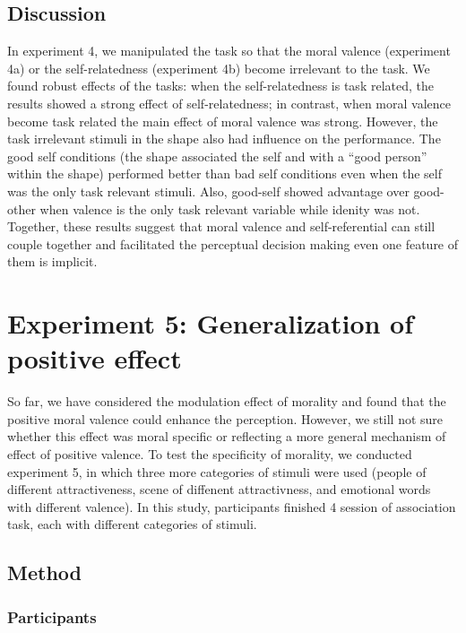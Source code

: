 \documentclass[man]{apa6}
\begin{document}
\hypertarget{discussion-4}{%
\subsection{Discussion}\label{discussion-4}}

In experiment 4, we manipulated the task so that the moral valence (experiment 4a) or the self-relatedness (experiment 4b) become irrelevant to the task. We found robust effects of the tasks: when the self-relatedness is task related, the results showed a strong effect of self-relatedness; in contrast, when moral valence become task related the main effect of moral valence was strong. However, the task irrelevant stimuli in the shape also had influence on the performance. The good self conditions (the shape associated the self and with a \enquote{good person} within the shape) performed better than bad self conditions even when the self was the only task relevant stimuli. Also, good-self showed advantage over good-other when valence is the only task relevant variable while idenity was not. Together, these results suggest that moral valence and self-referential can still couple together and facilitated the perceptual decision making even one feature of them is implicit.

\hypertarget{experiment-5-generalization-of-positive-effect}{%
\section{Experiment 5: Generalization of positive effect}\label{experiment-5-generalization-of-positive-effect}}

So far, we have considered the modulation effect of morality and found that the positive moral valence could enhance the perception. However, we still not sure whether this effect was moral specific or reflecting a more general mechanism of effect of positive valence. To test the specificity of morality, we conducted experiment 5, in which three more categories of stimuli were used (people of different attractiveness, scene of diffenent attractivness, and emotional words with different valence). In this study, participants finished 4 session of association task, each with different categories of stimuli.

\hypertarget{method-6}{%
\subsection{Method}\label{method-6}}

\hypertarget{participants-8}{%
\subsubsection{Participants}\label{participants-8}}
\end{document}
